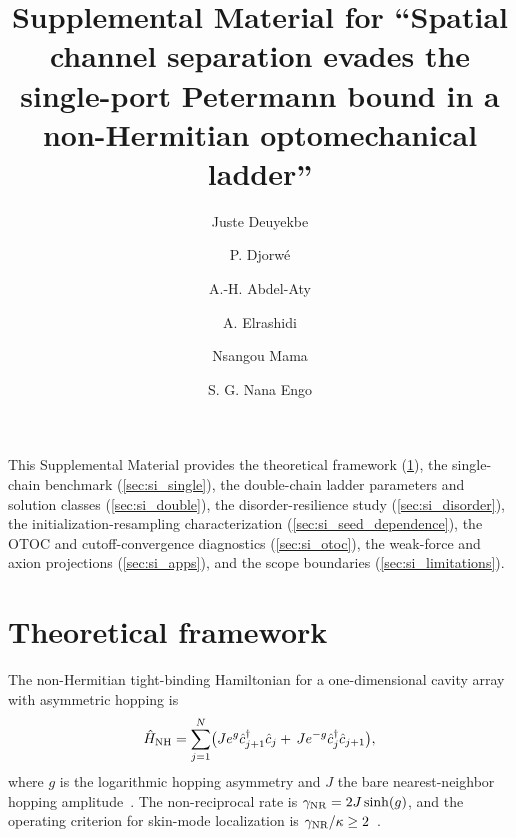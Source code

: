\documentclass[aps,prxquantum,preprint,superscriptaddress,amsmath,amssymb]{revtex4-2}
\newcommand{\gNR}{\gamma_{\rm NR}}
\begin{document}
\title{Supplemental Material for ``Spatial channel separation evades the single-port Petermann bound in a non-Hermitian optomechanical ladder''}

\author{Juste Deuyekbe}

\author{P. Djorw\'e}

\author{A.-H. Abdel-Aty}

\author{A. Elrashidi}

\author{Nsangou Mama}

\author{S. G. Nana Engo}

\maketitle

This Supplemental Material provides the theoretical framework (\cref{sec:si_theory}), the single-chain benchmark (\cref{sec:si_single}), the double-chain ladder parameters and solution classes (\cref{sec:si_double}), the disorder-resilience study (\cref{sec:si_disorder}), the initialization-resampling characterization (\cref{sec:si_seed_dependence}), the OTOC and cutoff-convergence diagnostics (\cref{sec:si_otoc}), the weak-force and axion projections (\cref{sec:si_apps}), and the scope boundaries (\cref{sec:si_limitations}).

\section{Theoretical framework}
\label{sec:si_theory}

The non-Hermitian tight-binding Hamiltonian for a one-dimensional cavity array with asymmetric hopping is
\begin{equation}\label{eq:si_nhse}
\hat{H}_{\rm NH}=\sum_{j=1}^{N}\bigl(J e^{g}\hat{c}_{j+1}^{\dagger}\hat{c}_{j}+\,J e^{-g}\hat{c}_{j}^{\dagger}\hat{c}_{j+1}\bigr),
\end{equation}
where $g$ is the logarithmic hopping asymmetry and $J$ the bare nearest-neighbor hopping amplitude~\citep{Yao2018,Hatano1997}. The non-reciprocal rate is $\gNR=2J\sinh(g)$, and the operating criterion for skin-mode localization is $\gNR/\kappa\ge\num{2}$~\citep{Bergholtz2021,Schomerus2020}.
\end{document}
